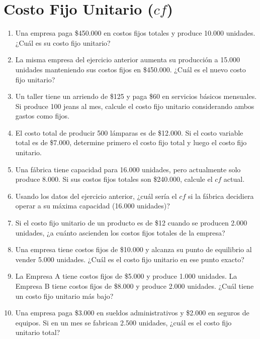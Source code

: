 \documentclass[12pt,a4paper]{article}
\newcommand{\answerspace}{\vspace{4.5cm}}
\newcommand{\lastanswerspace}{\vspace{2cm}}
\begin{document}
\newpage

\section{Costo Fijo Unitario ($cf$)}

\begin{enumerate}[label=\textbf{\arabic*.}, leftmargin=*, itemsep=0pt]

\item Una empresa paga \$450.000 en costos fijos totales y produce 10.000 unidades. ¿Cuál es su costo fijo unitario?
\answerspace

\item La misma empresa del ejercicio anterior aumenta su producción a 15.000 unidades manteniendo sus costos fijos en \$450.000. ¿Cuál es el nuevo costo fijo unitario?
\answerspace

\item Un taller tiene un arriendo de \$125 y paga \$60 en servicios básicos mensuales. Si produce 100 jeans al mes, calcule el costo fijo unitario considerando ambos gastos como fijos.
\answerspace

\item El costo total de producir 500 lámparas es de \$12.000. Si el costo variable total es de \$7.000, determine primero el costo fijo total y luego el costo fijo unitario.
\answerspace

\item Una fábrica tiene capacidad para 16.000 unidades, pero actualmente solo produce 8.000. Si sus costos fijos totales son \$240.000, calcule el $cf$ actual.
\answerspace

\item Usando los datos del ejercicio anterior, ¿cuál sería el $cf$ si la fábrica decidiera operar a su máxima capacidad (16.000 unidades)?
\answerspace

\item Si el costo fijo unitario de un producto es de \$12 cuando se producen 2.000 unidades, ¿a cuánto ascienden los costos fijos totales de la empresa?
\answerspace

\item Una empresa tiene costos fijos de \$10.000 y alcanza su punto de equilibrio al vender 5.000 unidades. ¿Cuál es el costo fijo unitario en ese punto exacto?
\answerspace

\item La Empresa A tiene costos fijos de \$5.000 y produce 1.000 unidades. La Empresa B tiene costos fijos de \$8.000 y produce 2.000 unidades. ¿Cuál tiene un costo fijo unitario más bajo?
\answerspace

\item Una empresa paga \$3.000 en sueldos administrativos y \$2.000 en seguros de equipos. Si en un mes se fabrican 2.500 unidades, ¿cuál es el costo fijo unitario total?
\lastanswerspace

\end{enumerate}
\end{document}
